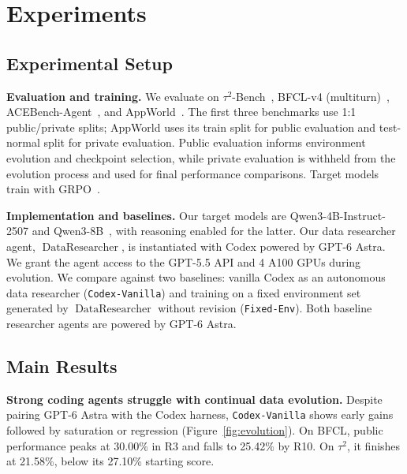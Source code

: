 \section{Experiments}
\label{sec:experiments}

\subsection{Experimental Setup}

\textbf{Evaluation and training.}\quad
We evaluate on $\tau^2$-Bench~\citep{tau2}, BFCL-v4 (multiturn)~\citep{bfcl},
ACEBench-Agent~\citep{acebench}, and AppWorld~\citep{appworld}.
The first three benchmarks use 1:1 public/private splits; AppWorld uses its
train split for public evaluation and test-normal split for private evaluation.
Public evaluation informs environment evolution and checkpoint
selection, while private evaluation is withheld from the evolution process and used
for final performance comparisons. Target models train with GRPO~\citep{grpo}.

\textbf{Implementation and baselines.}\quad
Our target models are Qwen3-4B-Instruct-2507 and Qwen3-8B~\citep{qwen3}, with
reasoning enabled for the latter.
Our data researcher agent, $\operatorname{DataResearcher}$, is instantiated
with Codex powered by GPT-6 Astra. We grant the agent access to the GPT-5.5 API
and 4 A100 GPUs during evolution. We compare against two baselines:
vanilla Codex as an autonomous data researcher (\texttt{Codex-Vanilla}) and
training on a fixed environment set generated by $\operatorname{DataResearcher}$
without revision (\texttt{Fixed-Env}). Both baseline researcher agents
are powered by GPT-6 Astra.

\subsection{Main Results}
\label{sec:mainresults}

\suppressfloats[t] %



\textbf{Strong coding agents struggle with continual data evolution.}\quad
Despite pairing GPT-6 Astra with the Codex harness, \texttt{Codex-Vanilla}
shows early gains followed by saturation or regression
(Figure~\ref{fig:evolution}). On BFCL, public performance peaks at 30.00\%
in R3 and falls to 25.42\% by R10.
On $\tau^2$, it finishes at 21.58\%, below its 27.10\% starting score.

